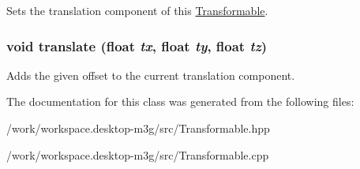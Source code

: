 Sets the translation component of this \hyperlink{classm3g_1_1Transformable}{Transformable}. \hypertarget{classm3g_1_1Transformable_66d493b8307a85e615c4eb89116f2e09}{
\subsubsection[{translate}]{\setlength{\rightskip}{0pt plus 5cm}void translate (float {\em tx}, \/  float {\em ty}, \/  float {\em tz})}}
\label{classm3g_1_1Transformable_66d493b8307a85e615c4eb89116f2e09}


Adds the given offset to the current translation component. 

The documentation for this class was generated from the following files:\begin{CompactItemize}
\item 
/work/workspace.desktop-m3g/src/Transformable.hpp\item 
/work/workspace.desktop-m3g/src/Transformable.cpp\end{CompactItemize}
